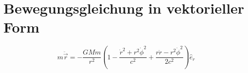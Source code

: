 \section{Bewegungsgleichung in vektorieller Form}
\[
m\ddot{\vec{r}} = -\frac{GMm}{r^2}\left(1 - \frac{\dot{r}^2 + r^2\dot{\phi}^2}{c^2} + \frac{r\ddot{r} - r^2\dot{\phi}^2}{2c^2}\right)\hat{e}_r
\]